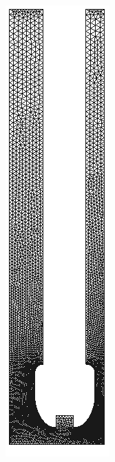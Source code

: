 \begin{figure}[H]
\begin{subfigure}[b]{0.1\linewidth}
	\end{subfigure}	
	\quad
	\quad
	\quad
	\quad
	\quad
	\begin{subfigure}[b]{0.1\linewidth}
		\includegraphics[width=\linewidth]{img/lisa_standoff.png}

\end{subfigure}
\end{figure}
